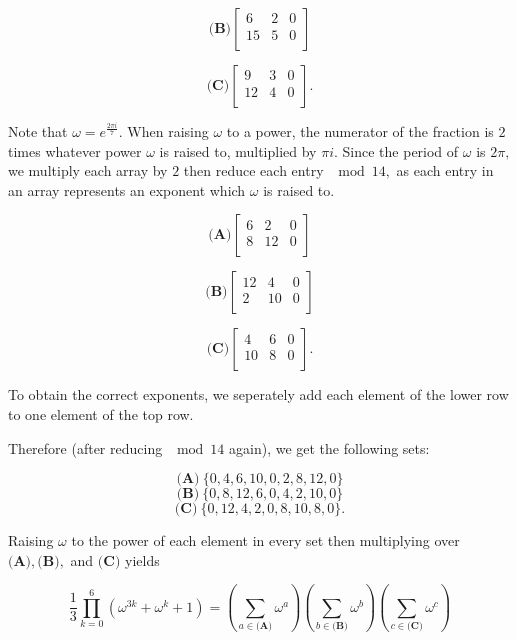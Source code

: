 \begin{enumerate}
 \[\textbf{(B)}\begin{bmatrix} 6&2 &0 \\ 15&5&0\\ \end{bmatrix}\]

 \[\textbf{(C)}\begin{bmatrix} 9&3 &0 \\ 12&4&0\\ \end{bmatrix}.\]

 
Note that $\omega=e^{\frac{2\pi i}{7}}$. When raising $\omega$ to a power, the numerator of the fraction is $2$ times whatever power $\omega$ is raised to, multiplied by $\pi i$. Since the period of $\omega$ is $2\pi,$ we multiply each array by $2$ then reduce each entry $\mod{14},$ as each entry in an array represents an exponent which $\omega$ is raised to.

 

 \[\textbf{(A)}\begin{bmatrix} 6&2 &0 \\ 8&12&0\\ \end{bmatrix}\]

 \[\textbf{(B)}\begin{bmatrix} 12&4 &0 \\ 2&10&0\\ \end{bmatrix}\]

 \[\textbf{(C)}\begin{bmatrix} 4&6 &0 \\ 10&8&0\\ \end{bmatrix}.\]

 To obtain the correct exponents, we seperately add each element of the lower row to one element of the top row. 

 Therefore (after reducing $\mod 14$ again), we get the following sets: 

 
 \[\textbf{(A)}\ \{0, 4, 6, 10, 0, 2, 8, 12, 0\}\]
 \[\textbf{(B)}\ \{0, 8, 12, 6, 0, 4, 2, 10, 0\}\]
 \[\textbf{(C)}\ \{0, 12, 4, 2, 0, 8, 10, 8, 0\}.\]

 Raising $\omega$ to the power of each element in every set then multiplying over $\textbf{(A)}, \textbf{(B)},$ and $\textbf{(C)}$ yields 

 
 \[\frac{1}{3} \prod_{k=0}^6 \left(\omega^{3k} + \omega^k + 1\right)=\left(\sum_{a\in \textbf{(A)}} \omega^a\right)\left(\sum_{b\in \textbf{(B)}} \omega^b\right)\left(\sum_{c\in \textbf{(C)}} \omega^c\right)\]


\end{enumerate}
